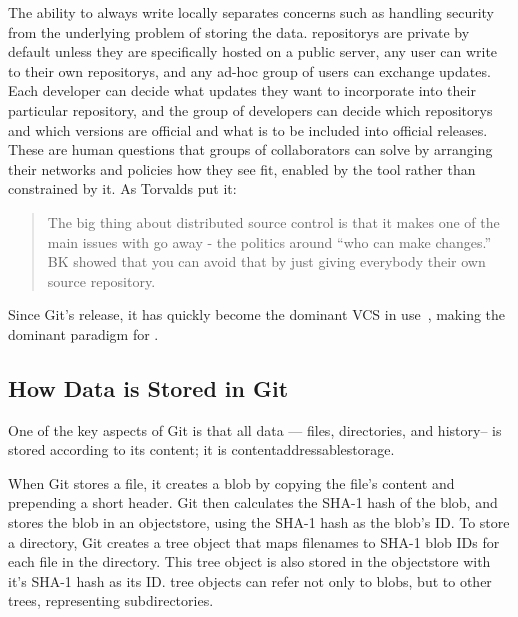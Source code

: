 The ability to always write locally separates concerns such as handling security
from the underlying problem of storing the data. \glspl{repository} are private
by default unless they are specifically hosted on a public server, any user can
write to their own \glspl{repository}, and any ad-hoc group of users can
exchange updates. Each developer can decide what updates they want to
incorporate into their particular \gls{repository}, and the group of developers
can decide which \glspl{repository} and which versions are official and what is
to be included into official releases. These are human questions that groups of
collaborators can solve by arranging their networks and policies how they see
fit, enabled by the tool rather than constrained by it. As Torvalds put it:

\blockcquote{git_10_years_interview}{The big thing about distributed source
    control is that it makes one of the main issues with  go
    away - the politics around \enquote{who can make changes.} BK
     showed that you can avoid that by just giving everybody
their own source \gls{repository}. }

Since Git's release, it has quickly become the dominant \gls{VCS} in
use~\cite{what_are_devs_talking_about}, making  the dominant paradigm for .

%


\subsection{How Data is Stored in Git}
\label{how-data-stored-in-git}

One of the key aspects of Git is that all data --- files, directories, and
history-- is stored according to its content; it is
\gls{contentaddressablestorage}.

When Git stores a file, it creates a \gls{blob} by copying the file's content
and prepending a short header. Git then calculates the SHA-1 hash of the
\gls{blob}, and stores the \gls{blob} in an \gls{objectstore}, using the SHA-1
hash as the \gls{blob}'s ID. To store a directory, Git creates a \gls{tree}
object that maps filenames to SHA-1 \gls{blob} IDs for each file in the
directory. This \gls{tree} object is also stored in the \gls{objectstore} with
it's SHA-1 hash as its ID. \Gls{tree} objects can refer not only to
\glspl{blob}, but to other \glspl{tree}, representing subdirectories.

